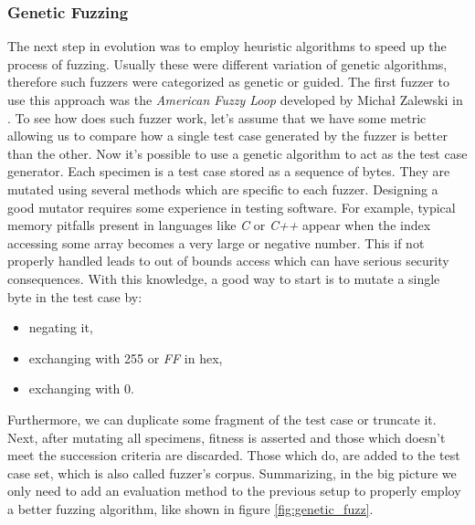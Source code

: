 \subsubsection{Genetic Fuzzing}

The next step in evolution was to employ heuristic algorithms to speed up the process of fuzzing. Usually these were different variation of genetic algorithms, therefore such fuzzers were categorized as genetic or guided. The first fuzzer to use this approach was the \textit{American Fuzzy Loop} developed by Michał Zalewski in \cite{afl}. To see how does such fuzzer work, let's assume that we have some metric allowing us to compare how a single test case generated by the fuzzer is better than the other. Now it's possible to use a genetic algorithm to act as the test case generator. Each specimen is a test case stored as a sequence of bytes. They are mutated using several methods which are specific to each fuzzer. Designing a good mutator requires some experience in testing software. For example, typical memory pitfalls present in languages like \textit{C} or \textit{C++} appear when the index accessing some array becomes a very large or negative number. This if not properly handled leads to out of bounds access which can have serious security consequences. With this knowledge, a good way to start is to mutate a single byte in the test case by:
\begin{itemize}
    \item negating it,
    \item exchanging with 255 or \textit{FF} in hex,
    \item exchanging with 0.
\end{itemize}
Furthermore, we can duplicate some fragment of the test case or truncate it. Next, after mutating all specimens, fitness is asserted and those which doesn't meet the succession criteria are discarded. Those which do, are added to the test case set, which is also called fuzzer's corpus. Summarizing, in the big picture we only need to add an evaluation method to the previous setup to properly employ a better fuzzing algorithm, like shown in figure \ref{fig:genetic_fuzz}.  

